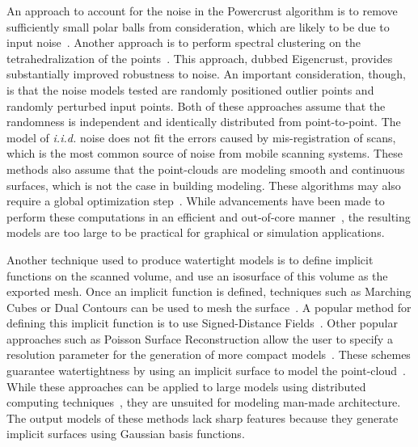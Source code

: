 \documentclass[12pt,onecolumn,oneside]{book}
\begin{document}
An approach to account for the noise in the Powercrust algorithm is to remove sufficiently small polar balls from consideration, which are likely to be due to input noise~\cite{NoisyPowercrust}.  Another approach is to perform spectral clustering on the tetrahedralization of the points~\cite{EigencrustShewchuk}.  This approach, dubbed Eigencrust, provides substantially improved robustness to noise.  An important consideration, though, is that the noise models tested are randomly positioned outlier points and randomly perturbed input points.  Both of these approaches assume that the randomness is independent and identically distributed from point-to-point.  The model of {\it i.i.d.} noise does not fit the errors caused by mis-registration of scans, which is the most common source of noise from mobile scanning systems.  These methods also assume that the point-clouds are modeling smooth and continuous surfaces, which is not the case in building modeling.  These algorithms may also require a global optimization step~\cite{EigencrustShewchuk}.  While advancements have been made to perform these computations in an efficient and out-of-core manner~\cite{RealTimeEigenCrust,StreamingDelaunay}, the resulting models are too large to be practical for graphical or simulation applications.

Another technique used to produce watertight models is to define implicit functions on the scanned volume, and use an isosurface of this volume as the exported mesh.  Once an implicit function is defined, techniques such as Marching Cubes or Dual Contours can be used to mesh the surface~\cite{MarchingCubes,DualContouring}. A popular method for defining this implicit function is to use Signed-Distance Fields~\cite{SignedDistanceFields}.  Other popular approaches such as Poisson Surface Reconstruction allow the user to specify a resolution parameter for the generation of more compact models~\cite{Poisson}.  These schemes guarantee watertightness by using an implicit surface to model the point-cloud~\cite{UnorganizedPoints}.  While these approaches can be applied to large models using distributed computing techniques~\cite{OutOfCorePoisson,ParallelPoisson}, they are unsuited for modeling man-made architecture.  The output models of these methods lack sharp features because they generate implicit surfaces using Gaussian basis functions.  
\end{document}
